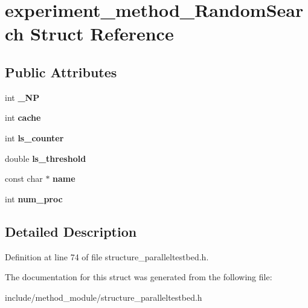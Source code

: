\hypertarget{structexperiment__method__RandomSearch}{\section{experiment\-\_\-method\-\_\-\-Random\-Search Struct Reference}
\label{structexperiment__method__RandomSearch}
}
\subsection*{Public Attributes}
\begin{DoxyCompactItemize}
\item 
\hypertarget{structexperiment__method__RandomSearch_a92132018422230e887eea56c4dcd8c82}{int {\bfseries \-\_\-\-N\-P}}\label{structexperiment__method__RandomSearch_a92132018422230e887eea56c4dcd8c82}

\item 
\hypertarget{structexperiment__method__RandomSearch_a8b5ed36ba6713d8aa5c9f20131c12c14}{int {\bfseries cache}}\label{structexperiment__method__RandomSearch_a8b5ed36ba6713d8aa5c9f20131c12c14}

\item 
\hypertarget{structexperiment__method__RandomSearch_a213d0f1dc89c34028d90e4ddbfd78900}{int {\bfseries ls\-\_\-counter}}\label{structexperiment__method__RandomSearch_a213d0f1dc89c34028d90e4ddbfd78900}

\item 
\hypertarget{structexperiment__method__RandomSearch_a3de683e974465f3e0e221be460a9aa27}{double {\bfseries ls\-\_\-threshold}}\label{structexperiment__method__RandomSearch_a3de683e974465f3e0e221be460a9aa27}

\item 
\hypertarget{structexperiment__method__RandomSearch_a158044fc6e5302beab1f712459f2db4a}{const char $\ast$ {\bfseries name}}\label{structexperiment__method__RandomSearch_a158044fc6e5302beab1f712459f2db4a}

\item 
\hypertarget{structexperiment__method__RandomSearch_a29d446a1244b6b40b34ada626246a97f}{int {\bfseries num\-\_\-proc}}\label{structexperiment__method__RandomSearch_a29d446a1244b6b40b34ada626246a97f}

\end{DoxyCompactItemize}


\subsection{Detailed Description}


Definition at line 74 of file structure\-\_\-paralleltestbed.\-h.



The documentation for this struct was generated from the following file\-:\begin{DoxyCompactItemize}
\item 
include/method\-\_\-module/structure\-\_\-paralleltestbed.\-h\end{DoxyCompactItemize}
